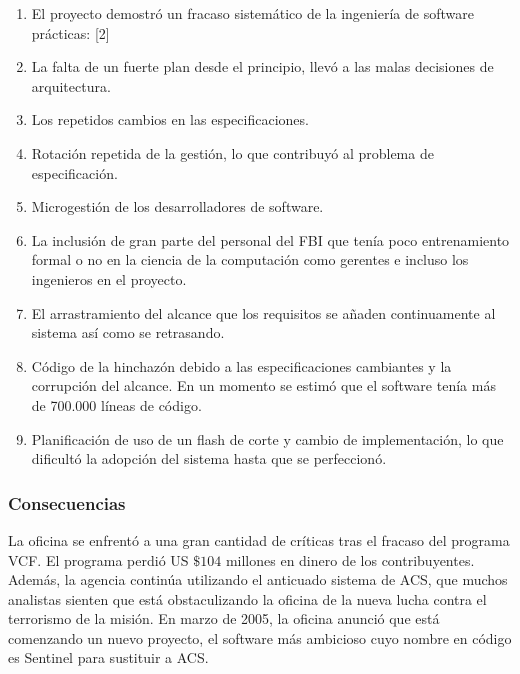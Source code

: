 \documentclass[titlepage,a4paper,twoside]{article}
\begin{document}
    \begin{enumerate}
    	\item El proyecto demostró un fracaso sistemático de la ingeniería de software prácticas: [2]
    	\item La falta de un fuerte plan desde el principio, llevó a las malas decisiones de arquitectura.
    	\item Los repetidos cambios en las especificaciones.
    	\item Rotación repetida de la gestión, lo que contribuyó al problema de especificación.
    	\item Microgestión de los desarrolladores de software.
    	\item La inclusión de gran parte del personal del FBI que tenía poco entrenamiento formal o no en la ciencia de la computación como gerentes e incluso los ingenieros en el proyecto.
    	\item El arrastramiento del alcance que los requisitos se añaden continuamente al sistema así como se retrasando.
    	\item Código de la hinchazón debido a las especificaciones cambiantes y la corrupción del alcance. En un momento se estimó que el software tenía más de 700.000 líneas de código.
    	\item Planificación de uso de un flash de corte y cambio de implementación, lo que dificultó la adopción del sistema hasta que se perfeccionó.
    \end{enumerate}
   
   
    \subsubsection{Consecuencias}
   
   
    La oficina se enfrentó a una gran cantidad de críticas tras el fracaso del programa VCF. El programa perdió US $\$104$ millones en dinero de los contribuyentes. Además, la agencia continúa utilizando el anticuado sistema de ACS, que muchos analistas sienten que está obstaculizando la oficina de la nueva lucha contra el terrorismo de la misión. En marzo de 2005, la oficina anunció que está comenzando un nuevo proyecto, el software más ambicioso cuyo nombre en código es Sentinel para sustituir a ACS.
   
\end{document}
